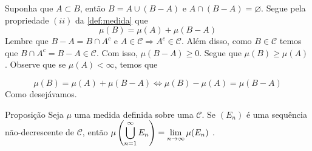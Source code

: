 \begin{prova}
	Suponha que $A \subset B$, então $B = A \cup (B - A)$ e $A \cap (B - A) = \varnothing$. Segue pela propriedade $(ii)$ da \ref{def:medida} que 
	$$\mu(B) = \mu(A) + \mu(B-A)$$
	Lembre que $B-A = B\cap A^c$ e $A \in \mathcal{C} \Rightarrow A^c \in \mathcal{C}$.
	Além disso, como $B \in \mathcal{C}$ temos que $ B\cap A^c = B - A \in \mathcal{C}$.
	Com isso, $\mu(B-A) \geq 0$.
	Segue que $\mu(B) \geq \mu(A)$.
	Observe que se $\mu(A) < \infty$, temos que 

	$$\mu(B) = \mu(A) + \mu(B-A) 
 \Leftrightarrow \mu(B) - \mu(A) =  \mu(B-A)
 $$
Como desejávamos.
\end{prova}

\begin{env}{Proposição}
\label{prop:limite-sequencia-crescente}
Seja $\mu$ uma medida definida sobre uma \sigal $\mathcal{C}$.
Se $(E_n)$ é uma sequência não-decrescente de $\mathcal{C}$, então $\mu\left(\displaystyle \bigcup_{n = 1}^\infty E_n\right) = \displaystyle \lim_{n \to \infty} \mu(E_n)$
\cite{bartle}.
\end{env} 

